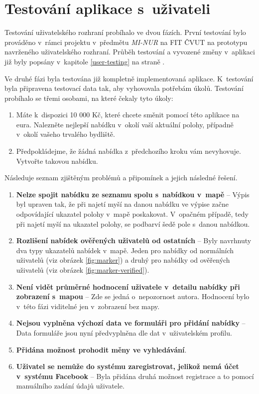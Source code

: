 \chapter{Testování aplikace s~uživateli}
\label{user-testing2}

Testování uživatelského rozhraní probíhalo ve dvou fázích. První testování bylo prováděno v~rámci projektu v~předmětu \textit{MI-NUR} na FIT ČVUT na prototypu navrženého uživatelského rozhraní. Průběh testování a vyvozené změny v~aplikaci již byly popsány v~kapitole \ref{user-testing} na straně \pageref{user-testing}.

Ve druhé fázi byla testována již kompletně implementovaná aplikace. K~testování byla připravena testovací data tak, aby vyhovovala potřebám úkolů. Testování probíhalo se třemi osobami, na které čekaly tyto úkoly:

\begin{enumerate}
    \item Máte k~dispozici 10 000 Kč, které chcete směnit pomocí této aplikace na eura. Nalezněte nejlepší nabídku v~okolí vaší aktuální polohy, případně v~okolí vašeho trvalého bydliště.
    \item Předpokládejme, že žádná nabídka z~předchozího kroku vám nevyhovuje. Vytvořte takovou nabídku.
\end{enumerate}

Následuje seznam zjištěným problémů a připomínek a jejich následné řešení.

\begin{enumerate}
    \item \textbf{Nelze spojit nabídku ze seznamu spolu s~nabídkou v~mapě} -- Výpis byl upraven tak, že při najetí myší na danou nabídku ve výpise začne odpovídající ukazatel polohy v~mapě poskakovat. V~opačném případě, tedy při najetí myší na ukazatel polohy, se podbarví šedě pole s~danou nabídkou.
    \item \textbf{Rozlišení nabídek ověřených uživatelů od ostatních} -- Byly navrhnuty dva typy ukazatelů nabídek v~mapě. Jeden pro nabídky od normálních uživatelů (viz obrázek \ref{fig:marker}) a druhý pro nabídky od ověřených uživatelů (viz obrázek \ref{fig:marker-verified}).
    \item \textbf{Není vidět průměrné hodnocení uživatele v~detailu nabídky při zobrazení s~mapou} -- Zde se jedná o~nepozornost autora. Hodnocení bylo v~této fázi viditelné jen v~zobrazení bez mapy.
    \item \textbf{Nejsou vyplněna výchozí data ve formuláři pro přidání nabídky} -- Data formuláře jsou nyní předvyplněna dle dat v~uživatelském profilu.
    \item \textbf{Přidána možnost prohodit měny ve vyhledávání}.
    \item \textbf{Uživatel se nemůže do systému zaregistrovat, jelikož nemá účet v~systému Facebook} -- Byla přidána druhá možnost registrace a to pomocí manuálního zadání údajů uživatele.
\end{enumerate}


